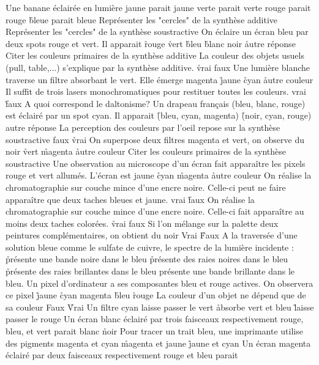 \q
Une banane éclairée en lumière 
\rv
jaune parait jaune
\rv
verte parait verte
\rv
rouge parait rouge
\r
bleue parait bleue
\q
Représenter les "cercles" de la synthèse additive
\q
Représenter les "cercles" de la synthèse soustractive
\q
On éclaire un écran bleu par deux spots rouge et vert. Il apparait
\r
rouge
\r
vert
\r
bleu
\r
blanc
\rv
noir
\r
autre réponse
\q
Citer les couleurs primaires de la synthèse additive
\q
La couleur des objets usuels (pull, table,...) s'explique par la synthèse additive.
\r
vrai
\rv
faux
\q
Une lumière blanche traverse un filtre absorbant le vert. Elle émerge
\rv
magenta
\r
jaune
\r
cyan
\r
autre couleur
\q
Il suffit de trois lasers monochromatiques pour restituer toutes les couleurs.
\rv
vrai
\r
faux
\q
A quoi correspond le daltonisme?
\q
Un drapeau français (bleu, blanc, rouge) est éclairé par un spot cyan. Il apparait
\r
(bleu, cyan, magenta)
\r
(noir, cyan, rouge)
\rv
autre réponse  
\q
La perception des couleurs par l'oeil repose sur la synthèse soustractive
\rv
faux
\r
vrai
\q
On superpose deux filtres magenta et vert, on observe du
\rv
noir
\r
vert
\r
magenta
\r
autre couleur
\q
Citer les couleurs primaires de la synthèse soustractive
\q
Une observation au microscope d'un écran fait apparaître les pixels rouge et vert allumés. L'écran est
\rv
jaune
\r
cyan
\r
magenta
\r
autre couleur
\q
On réalise la chromatographie sur couche mince d'une encre noire. Celle-ci peut ne faire apparaître que deux taches bleues et jaune.
\rv
vrai
\r
faux
\q
On réalise la chromatographie sur couche mince d'une encre noire. Celle-ci fait apparaître au moins deux taches colorées.
\r
vrai
\rv
faux
\q
Si l'on mélange sur la palette deux peintures complémentaires, on obtient du noir
\rv
Vrai
\r
Faux
\q
A la traversée d'une solution bleue comme le sulfate de cuivre, le spectre de la lumière incidente :
\r
présente une bande noire dans le bleu
\r
présente des raies noires dans le bleu
\r
présente des raies brillantes dans le bleu
\rv
présente une bande brillante dans le bleu.
\q
Un pixel d'ordinateur a ses composantes bleu et rouge actives. On observera ce pixel
\r
jaune
\r
cyan
\rv
magenta
\r
bleu
\r
rouge
\q
La couleur d'un objet ne dépend que de sa couleur
\rv
Faux
\r
Vrai
\q
Un filtre cyan
\rv
laisse passer le vert
\r
absorbe vert et bleu
\r
laisse passer le rouge
\q
Un écran blanc éclairé par trois faisceaux respectivement rouge, bleu, et vert parait
\rv
blanc
\r
noir
\q
Pour tracer un trait bleu, une imprimante utilise des pigments
\rv
magenta et cyan
\r
magenta et jaune
\r
jaune et cyan
\q
Un écran magenta éclairé par deux faisceaux respectivement rouge et bleu parait
